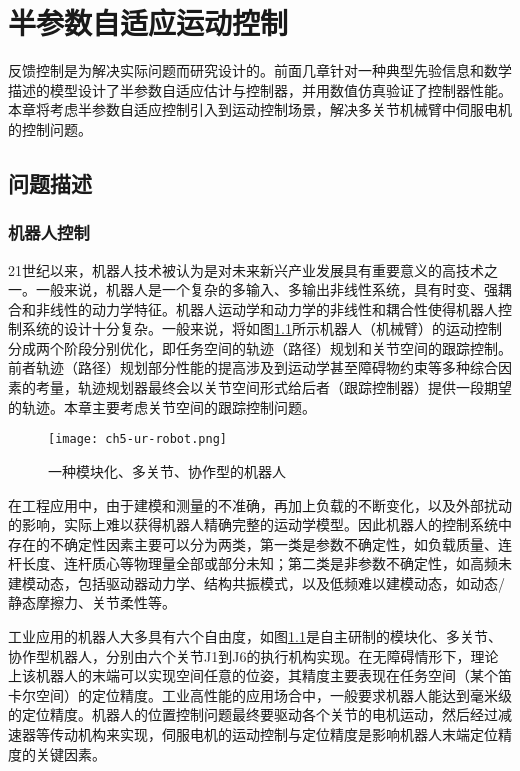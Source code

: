 \chapter{半参数自适应运动控制}\label{chap:5}
反馈控制是为解决实际问题而研究设计的。前面几章针对一种典型先验信息和数学描述的模型设计了半参数自适应估计与控制器，并用数值仿真验证了控制器性能。本章将考虑半参数自适应控制引入到运动控制场景，解决多关节机械臂中伺服电机的控制问题。
\section{问题描述}\label{chap:5.1}
\subsection{机器人控制}\label{5.1.1}
21世纪以来，机器人技术被认为是对未来新兴产业发展具有重要意义的高技术之一。一般来说，机器人是一个复杂的多输入、多输出非线性系统，具有时变、强耦合和非线性的动力学特征。机器人运动学和动力学的非线性和耦合性使得机器人控制系统的设计十分复杂。一般来说，将如图\ref{fig.robot}所示机器人（机械臂）的运动控制分成两个阶段分别优化，即任务空间的轨迹（路径）规划和关节空间的跟踪控制。前者轨迹（路径）规划部分性能的提高涉及到运动学甚至障碍物约束等多种综合因素的考量，轨迹规划器最终会以关节空间形式给后者（跟踪控制器）提供一段期望的轨迹。本章主要考虑关节空间的跟踪控制问题。

\begin{figure}[!htb]
	\centering
	\texttt{[image: ch5-ur-robot.png]}\\	 %
	\caption{一种模块化、多关节、协作型的机器人}
	\label{fig.robot}
\end{figure}

在工程应用中，由于建模和测量的不准确，再加上负载的不断变化，以及外部扰动的影响，实际上难以获得机器人精确完整的运动学模型。因此机器人的控制系统中存在的不确定性因素主要可以分为两类，第一类是参数不确定性，如负载质量、连杆长度、连杆质心等物理量全部或部分未知；第二类是非参数不确定性，如高频未建模动态，包括驱动器动力学、结构共振模式，以及低频难以建模动态，如动态/静态摩擦力、关节柔性等。

工业应用的机器人大多具有六个自由度，如图\ref{fig.robot}是自主研制的模块化、多关节、协作型机器人，分别由六个关节J1到J6的执行机构实现。在无障碍情形下，理论上该机器人的末端可以实现空间任意的位姿，其精度主要表现在任务空间（某个笛卡尔空间）的定位精度。工业高性能的应用场合中，一般要求机器人能达到毫米级的定位精度。机器人的位置控制问题最终要驱动各个关节的电机运动，然后经过减速器等传动机构来实现，伺服电机的运动控制与定位精度是影响机器人末端定位精度的关键因素。

